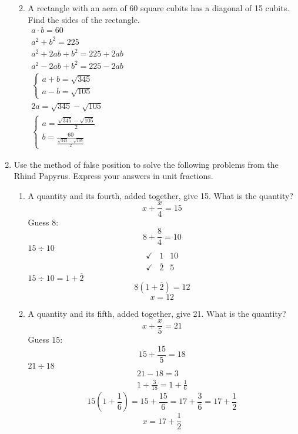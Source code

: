 \documentclass[12pt]{article}
\begin{document}
\begin{enumerate}[label=\textbf{\arabic*}.]
\begin{enumerate}
        \pagebreak
        \item A rectangle with an aera of 60 square cubits has a diagonal of 15 cubits. Find 
        the sides of the rectangle. \\
        \(\begin{aligned}
            a \cdot b = 60 \\
            a^2 + b^2 = 225\\
            a^2 + 2ab + b^2 = 225 + 2ab\\
            a^2-2ab +b ^2 = 225-2ab \\
            \begin{cases}
                a+b = \sqrt{345} \\
                a-b = \sqrt{105}
            \end{cases} \\
            2a = \sqrt{345} - \sqrt{105} \\
            \begin{cases}
            a = \frac{\sqrt{345}-\sqrt{105}}{2}\\
            b = \frac{60}{\frac{\sqrt{345}-\sqrt{105}}{2}}
            \end{cases}
        \end{aligned}\) \qquad \qquad \qquad 
    \end{enumerate}
    \item Use the method of false position to solve the following problems from the \\Rhind 
    Papyrus. Express your answers in unit fractions.
    \begin{enumerate}
        \item A quantity and its fourth, added together, give 15. What is the quantity?
        \[x+\frac{x}{4} = 15\]
        Guess 8:
        \[8 + \frac{8}{4} = 10\]
        $15 \div 10$
        \begin{align*}
            \checkmark&1 & 10 \\
            \checkmark&\overline{2} & 5
        \end{align*}
        $15 \div 10 = 1 + \overline{2}$
        \[8(1+\overline{2}) = 12 \]\[x = 12 \]
        \item A quantity and its fifth, added together, give 21. What is the quantity?
        \[x + \frac{x}{5} = 21\]
        Guess 15:
        \[15 + \frac{15}{5} = 18\]
        $21 \div 18$
        \begin{gather*}
            21-18=3 \\ 
            1 + \frac{3}{18} = 1+\frac{1}{6}
        \end{gather*}
        \[15(1+\frac{1}{6}) = 15 + \frac{15}{6} = 17 + \frac{3}{6} = 17 + \frac{1}{2}\]
        \[x = 17 + \frac{1}{2}\]
    \end{enumerate}
\end{enumerate}
\end{document}
